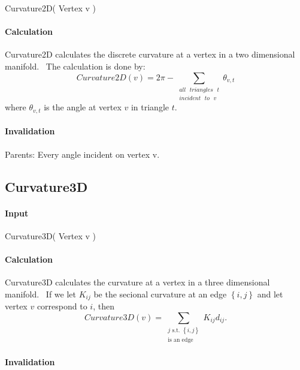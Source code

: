 Curvature2D( Vertex v )

\paragraph{Calculation}

Curvature2D calculates the discrete curvature at a vertex in a two
dimensional manifold. \ The calculation is done by:%
\begin{equation*}
Curvature2D\left( v\right) =2\pi -\sum\limits_{\substack{ all\text{ }%
triangles\text{ }t  \\ incident\text{ }to\text{ }v}}\theta _{v,t}
\end{equation*}%
where $\theta _{v,t}$ is the angle at vertex $v$ in triangle $t$. \ 

\paragraph{Invalidation}

\bigskip Parents: Every angle incident on vertex v.

\subsection{Curvature3D}

\paragraph{Input}

Curvature3D( Vertex v )

\paragraph{Calculation}

Curvature3D calculates the curvature at a vertex in a three dimensional
manifold. \ If we let $K_{ij}$ be the secional curvature at an edge $\left\{
i,j\right\} $ and let vertex $v$ correspond to $i$, then%
\begin{equation*}
Curvature3D\left( v\right) =\sum\limits_{\substack{ j\text{ s.t. }\left\{
i,j\right\}  \\ \text{is an edge}}}K_{ij}d_{ij}.
\end{equation*}

\paragraph{Invalidation}

